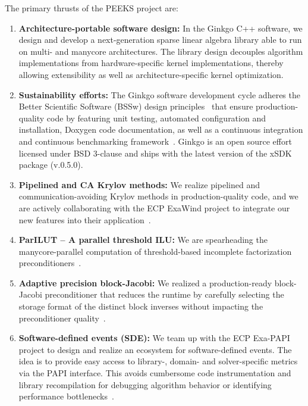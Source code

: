 The primary thrusts of the PEEKS project are:
\begin{enumerate}
    \item \textbf{Architecture-portable software design:}
	In the Ginkgo C++ software, we design and develop a next-generation 
	sparse linear algebra library able to run on multi- and manycore 
	architectures. The library design decouples
	algorithm implementations from hardware-specific kernel implementations, 
	thereby allowing extensibility as well as 
	architecture-specific kernel optimization. 
   \item \textbf{Sustainability efforts:}
	The Ginkgo software development cycle adheres the Better Scientific 
	Software (BSSw) design principles~\cite{betterscientificsoftware} that 
	ensure production-quality code by featuring unit testing, automated 
	configuration and installation, Doxygen code documentation, as well as a 
	continuous integration and continuous benchmarking 
	framework~\cite{pasc_anzt}. Ginkgo is an 
	open source effort licensed under BSD 3-clause and ships with the latest 
	version of the xSDK package (v.0.5.0). 
   \item \textbf{Pipelined and CA Krylov methods:} 
    We realize pipelined and 
	communication-avoiding Krylov methods in production-quality code, and 
	we are actively collaborating with the ECP ExaWind project to integrate 
        our new features into their application~\cite{Yamazaki-lowsynch}. 
	\item \textbf{ParILUT -- A parallel threshold ILU:}  We are spearheading 
	the manycore-parallel computation of threshold-based 
	incomplete factorization preconditioners~\cite{sisc_anzt,ipdps_anzt}. 
	\item \textbf{Adaptive precision block-Jacobi:}  We realized a 
	production-ready block-Jacobi preconditioner that reduces the runtime by 
	carefully selecting the storage format of the distinct block inverses 
	without impacting the preconditioner quality~\cite{toms_anzt}. 
   \item \textbf{Software-defined events (SDE):}  We team up with the ECP 
    Exa-PAPI project to design and realize an ecosystem for software-defined 
    events. The idea is to provide 
    easy access 
    to library-, domain- and solver-specific metrics via the PAPI interface. 
    This avoids cumbersome code instrumentation and library recompilation for 
    debugging algorithm behavior or identifying performance 
    bottlenecks~\cite{doi:10.1177/1094342019846287}. 
\end{enumerate}


